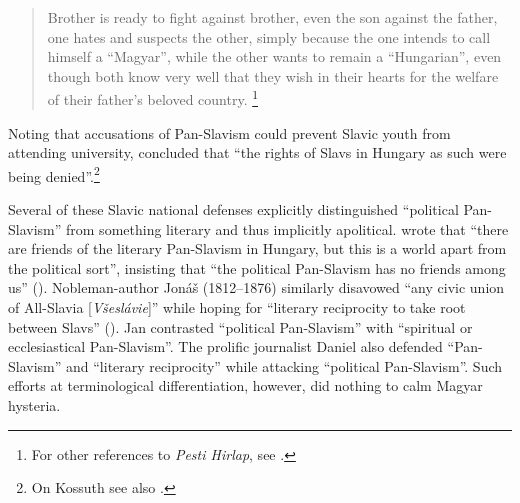 \begin{quote}
    Brother is ready to fight against brother, even the son against the father, one hates and suspects the other, simply because the one intends to call himself a “Magyar”, while the other wants to remain a “Hungarian”, even though both know very well that they wish in their hearts for the welfare of their father’s beloved country. \citep[6]{hoitsy_apologie_1843}\footnote{For other references to \textit{Pesti Hirlap}, see \citet[20, 41, 63, 77--79, 82, 93]{hoitsy_apologie_1843}.}
\end{quote}

\newpage

\noindent Noting that accusations of Pan-Slavism could prevent Slavic youth from attending university, \citet[25]{stur_beschwerden_1843} concluded that “the rights of Slavs in Hungary as such were being denied”.\footnote{On Kossuth see also \citet[28--30]{stur_beschwerden_1843}.}

Several of these Slavic national defenses explicitly distinguished “political Pan-Slavism” from something literary and thus implicitly apolitical. \citet[97]{hoitsy_apologie_1843} wrote that “there are friends of the literary Pan-Slavism in Hungary, but this is a world apart from the political sort”, insisting that “the political Pan-Slavism has no friends among us” (\citeyear[99]{hoitsy_apologie_1843}). Nobleman-author Jonáš \citeauthor{zaborsky_predmluva_1851} (1812--1876) similarly disavowed “any civic union of All-Slavia [\textit{Všeslávie}]” while hoping for “literary reciprocity to take root between Slavs” (\citeyear[ii]{zaborsky_predmluva_1851}). Jan \citet[83]{tenora_vyznam_1885} contrasted “political Pan-Slavism” with “spiritual or ecclesiastical Pan-Slavism”. The prolific journalist Daniel \citet[5, 7]{lichard_rozhowor_1861} also defended “Pan-Slavism” and “literary reciprocity” while attacking “political Pan-Slavism”. Such efforts at terminological differentiation, however, did nothing to calm Magyar hysteria.

